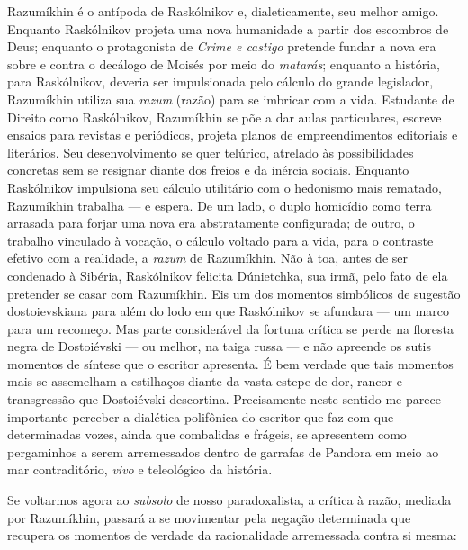 Razumíkhin é o antípoda de Raskólnikov e, dialeticamente, seu melhor
amigo. Enquanto Raskólnikov projeta uma nova humanidade a partir dos
escombros de Deus; enquanto o protagonista de \emph{Crime e castigo}
pretende fundar a nova era sobre e contra o decálogo de Moisés por meio
do \emph{matarás}; enquanto a história, para Raskólnikov, deveria ser
impulsionada pelo cálculo do grande legislador, Razumíkhin utiliza sua
\emph{razum} (razão) para se imbricar com a vida. Estudante de Direito
como Raskólnikov, Razumíkhin se põe a dar aulas particulares, escreve
ensaios para revistas e periódicos, projeta planos de empreendimentos
editoriais e literários. Seu desenvolvimento se quer telúrico, atrelado
às possibilidades concretas sem se resignar diante dos freios e da
inércia sociais. Enquanto Raskólnikov impulsiona seu cálculo utilitário
com o hedonismo mais rematado, Razumíkhin trabalha --- e espera. De um
lado, o duplo homicídio como terra arrasada para forjar uma nova era
abstratamente configurada; de outro, o trabalho vinculado à vocação, o
cálculo voltado para a vida, para o contraste efetivo com a realidade, a
\emph{razum} de Razumíkhin. Não à toa, antes de ser condenado à Sibéria,
Raskólnikov felicita Dúnietchka, sua irmã, pelo fato de ela pretender se
casar com Razumíkhin. Eis um dos momentos simbólicos de sugestão
dostoievskiana para além do lodo em que Raskólnikov se afundara --- um
marco para um recomeço. Mas parte considerável da fortuna crítica se
perde na floresta negra de Dostoiévski --- ou melhor, na taiga russa --- e
não apreende os sutis momentos de síntese que o escritor apresenta. É
bem verdade que tais momentos mais se assemelham a estilhaços diante da
vasta estepe de dor, rancor e transgressão que Dostoiévski descortina.
Precisamente neste sentido me parece importante perceber a dialética
polifônica do escritor que faz com que determinadas vozes, ainda que
combalidas e frágeis, se apresentem como pergaminhos a serem
arremessados dentro de garrafas de Pandora em meio ao mar contraditório,
\emph{vivo} e teleológico da história.

Se voltarmos agora ao \emph{subsolo} de nosso paradoxalista, a crítica à
razão, mediada por Razumíkhin, passará a se movimentar pela negação
determinada que recupera os momentos de verdade da racionalidade
arremessada contra si mesma:


